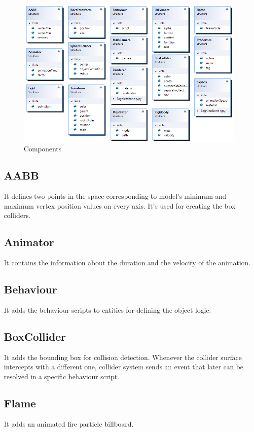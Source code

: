 \documentclass[12pt, english]{article}
\begin{document}
\begin{figure}
	\centering
	\includegraphics[width=\textwidth]{image7.png}
	\caption{Components}
	\label{figure_components}
\end{figure}


\subsection{AABB}
It defines two points in the space corresponding to model’s minimum and maximum
vertex position values on every axis. It's used for creating the box colliders.

\subsection{Animator}
It contains the information about the duration and the velocity of the
animation.

\subsection{Behaviour}
It adds the behaviour scripts to entities for defining the object logic.

\subsection{BoxCollider}
It adds the bounding box for collision detection. Whenever the collider surface
intercepts with a different one, collider system sends an event that later can
be resolved in a specific behaviour script.

\subsection{Flame}
It adds an animated fire particle billboard.
\end{document}
